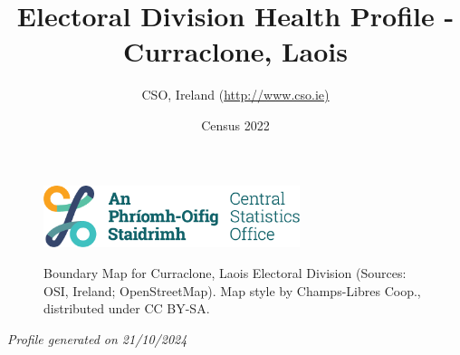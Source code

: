 \documentclass{article}
\title{Electoral Division Health Profile - Curraclone, Laois}
\date{Census 2022}
\author{CSO, Ireland  (\url{http://www.cso.ie)}}
\begin{document}


\begin{figure}
	\centering
\includegraphics[width =75mm]{../figures/CSO_Logo.png}
\end{figure}

\begin{figure}[h]
	\centering
	\setlength{\fboxsep}{1pt}
	\caption{\normalsize Boundary Map for Curraclone, Laois Electoral Division (Sources: OSI, Ireland; OpenStreetMap). Map style by Champs-Libres Coop., distributed under CC BY-SA.}
	\label{fig:2ae19629-1a6a-13a3-e055-000000000001}
	\end{figure}
	{\let\newpage\relax\maketitle}
	     \begin{center}
         \emph{Profile generated on 21/10/2024}
     \end{center}
\end{document}

